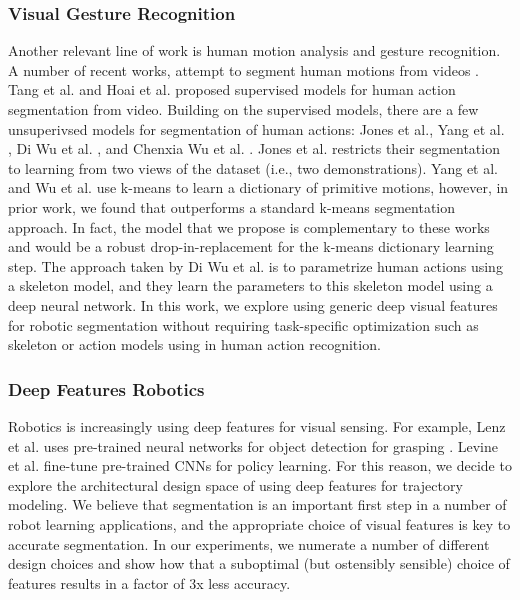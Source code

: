 \subsubsection{Visual Gesture Recognition}
Another relevant line of work is human motion analysis and gesture recognition.
A number of recent works, attempt to segment human motions from videos \cite{hoai2011joint, tang2012learning, yang2013discovering, jones2014unsupervised, wu2014leveraging, wu2015watch}.
Tang et al. and Hoai et al. proposed supervised models for human action segmentation from video.
Building on the supervised models, there are a few unsuperivsed models for segmentation of human actions: Jones et al.\cite{jones2014unsupervised}, Yang et al. \cite{yang2013discovering}, Di Wu et al. \cite{wu2014leveraging} , and Chenxia Wu et al. \cite{wu2015watch}.
Jones et al. \cite{jones2014unsupervised} restricts their segmentation to learning from two views of the dataset (i.e., two demonstrations).
Yang et al. \cite{yang2013discovering} and Wu et al.  \cite{wu2015watch} use k-means to learn a dictionary of primitive motions, however, in prior work, we found that \sys outperforms a standard k-means segmentation approach.
In fact, the model that we propose is complementary to these works and \sys would be a robust drop-in-replacement for the k-means dictionary learning step.
The approach taken by Di Wu et al. is to parametrize human actions using a skeleton model, and they learn the parameters to this skeleton model using a deep neural network.
In this work, we explore using generic deep visual features for robotic segmentation without requiring task-specific
optimization such as skeleton or action models using in human action recognition. 

\subsubsection{Deep Features Robotics}
Robotics is increasingly using deep features for visual sensing. For example, Lenz et al. uses pre-trained neural networks for object detection for grasping \cite{lenz2015deep}.
Levine et al. \cite{levine2015end} fine-tune pre-trained CNNs for policy learning.
For this reason, we decide to explore the architectural design space of using deep features for trajectory modeling.
We believe that segmentation is an important first step in a number of robot learning applications, and the appropriate choice of visual features is key to accurate segmentation.
In our experiments, we numerate a number of different design choices and show how that a suboptimal (but ostensibly sensible) choice of features results in a factor of 3x less accuracy.

